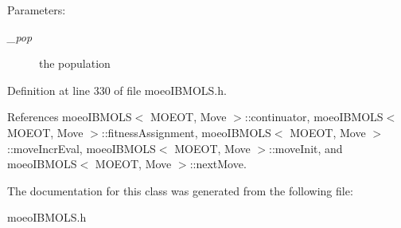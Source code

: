\begin{Desc}
\item[Parameters:]
\begin{description}
\item[{\em \_\-pop}]the population \end{description}
\end{Desc}


Definition at line 330 of file moeo\-IBMOLS.h.

References moeo\-IBMOLS$<$ MOEOT, Move $>$::continuator, moeo\-IBMOLS$<$ MOEOT, Move $>$::fitness\-Assignment, moeo\-IBMOLS$<$ MOEOT, Move $>$::move\-Incr\-Eval, moeo\-IBMOLS$<$ MOEOT, Move $>$::move\-Init, and moeo\-IBMOLS$<$ MOEOT, Move $>$::next\-Move.

The documentation for this class was generated from the following file:\begin{CompactItemize}
\item 
moeo\-IBMOLS.h\end{CompactItemize}
